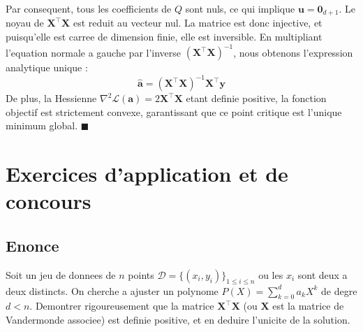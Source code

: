 \documentclass[11pt,a4paper]{report}
\begin{document}
Par consequent, tous les coefficients de $Q$ sont nuls, ce qui implique $\mathbf{u} = \mathbf{0}_{d+1}$.
Le noyau de $\mathbf{X}^\top\mathbf{X}$ est reduit au vecteur nul. La matrice est donc injective, et puisqu'elle est carree de dimension finie, elle est inversible.
En multipliant l'equation normale a gauche par l'inverse $(\mathbf{X}^\top\mathbf{X})^{-1}$, nous obtenons l'expression analytique unique :
$$ \hat{\mathbf{a}} = (\mathbf{X}^\top\mathbf{X})^{-1}\mathbf{X}^\top\mathbf{y} $$
De plus, la Hessienne $\nabla^2 \mathcal{L}(\mathbf{a}) = 2\mathbf{X}^\top\mathbf{X}$ etant definie positive, la fonction objectif est strictement convexe, garantissant que ce point critique est l'unique minimum global. $\blacksquare$


\begin{center}
\end{center}

\chapter{Exercices d'application et de concours}
\section{Enonce}
Soit un jeu de donnees de $n$ points $\mathcal{D} = \{(x_i, y_i)\}_{1 \le i \le n}$ ou les $x_i$ sont deux a deux distincts. On cherche a ajuster un polynome $P(X) = \sum_{k=0}^d a_k X^k$ de degre $d < n$.
Demontrer rigoureusement que la matrice $\mathbf{X}^\top\mathbf{X}$ (ou $\mathbf{X}$ est la matrice de Vandermonde associee) est definie positive, et en deduire l'unicite de la solution.
\end{document}
